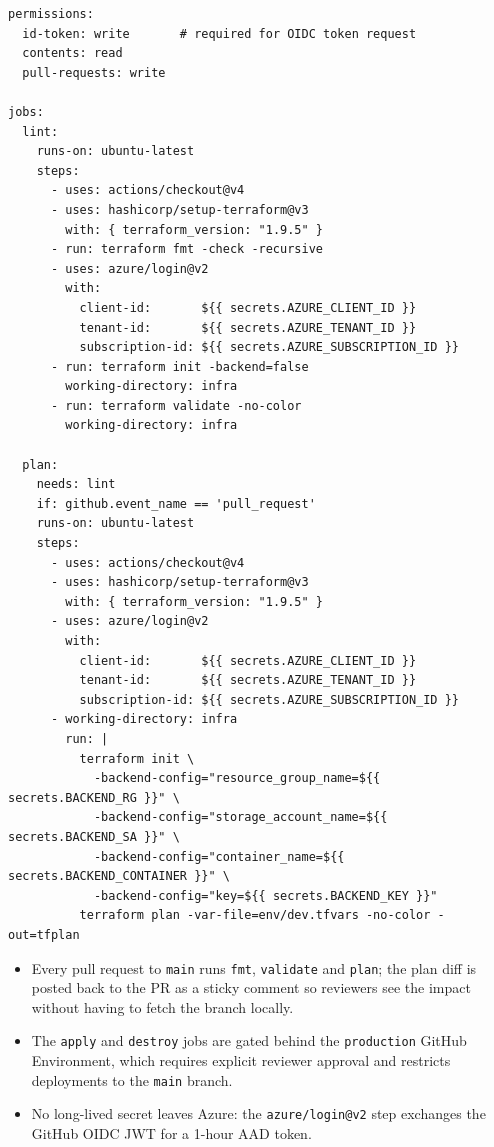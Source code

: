 \documentclass[10pt,a4paper,twocolumn]{article}
\begin{document}
\begin{lstlisting}[style=yamlcode, caption={Lint + Plan jobs (excerpt of \texttt{.github/workflows/terraform.yml})}]
permissions:
  id-token: write       # required for OIDC token request
  contents: read
  pull-requests: write

jobs:
  lint:
    runs-on: ubuntu-latest
    steps:
      - uses: actions/checkout@v4
      - uses: hashicorp/setup-terraform@v3
        with: { terraform_version: "1.9.5" }
      - run: terraform fmt -check -recursive
      - uses: azure/login@v2
        with:
          client-id:       ${{ secrets.AZURE_CLIENT_ID }}
          tenant-id:       ${{ secrets.AZURE_TENANT_ID }}
          subscription-id: ${{ secrets.AZURE_SUBSCRIPTION_ID }}
      - run: terraform init -backend=false
        working-directory: infra
      - run: terraform validate -no-color
        working-directory: infra

  plan:
    needs: lint
    if: github.event_name == 'pull_request'
    runs-on: ubuntu-latest
    steps:
      - uses: actions/checkout@v4
      - uses: hashicorp/setup-terraform@v3
        with: { terraform_version: "1.9.5" }
      - uses: azure/login@v2
        with:
          client-id:       ${{ secrets.AZURE_CLIENT_ID }}
          tenant-id:       ${{ secrets.AZURE_TENANT_ID }}
          subscription-id: ${{ secrets.AZURE_SUBSCRIPTION_ID }}
      - working-directory: infra
        run: |
          terraform init \
            -backend-config="resource_group_name=${{ secrets.BACKEND_RG }}" \
            -backend-config="storage_account_name=${{ secrets.BACKEND_SA }}" \
            -backend-config="container_name=${{ secrets.BACKEND_CONTAINER }}" \
            -backend-config="key=${{ secrets.BACKEND_KEY }}"
          terraform plan -var-file=env/dev.tfvars -no-color -out=tfplan
\end{lstlisting}

\begin{resultbox}[title={Pipeline behaviour}]
\begin{itemize}
  \item Every pull request to \texttt{main} runs \texttt{fmt},
        \texttt{validate} and \texttt{plan}; the plan diff is posted
        back to the PR as a sticky comment so reviewers see the impact
        without having to fetch the branch locally.
  \item The \texttt{apply} and \texttt{destroy} jobs are gated behind
        the \texttt{production} GitHub Environment, which requires
        explicit reviewer approval and restricts deployments to the
        \texttt{main} branch.
  \item No long-lived secret leaves Azure: the \texttt{azure/login@v2}
        step exchanges the GitHub OIDC JWT for a 1-hour AAD token.
\end{itemize}
\end{resultbox}
\end{document}
